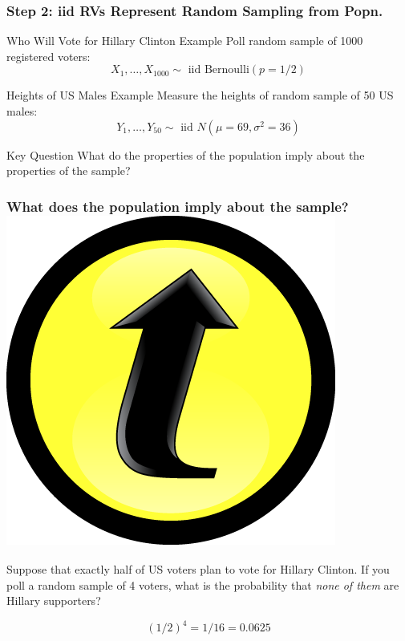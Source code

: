 \documentclass[handout]{beamer}
\begin{document}
\begin{frame}
  \frametitle{Step 2: iid RVs Represent Random Sampling from Popn.}
  \begin{block}{Who Will Vote for Hillary Clinton Example}
   Poll random sample of 1000 registered voters:
   $$X_1, \hdots, X_{1000} \sim \mbox{ iid Bernoulli}(p = 1/2)$$
  \end{block}
  \begin{block}{Heights of US Males Example}
   Measure the heights of random sample of 50 US males:
   $$Y_1, \hdots, Y_{50}  \sim \mbox{ iid } N(\mu = 69, \sigma^2 = 36)$$
  \end{block}

  \begin{block}{Key Question}
   What do the properties of the population imply about the properties of the sample? 
  \end{block}
\end{frame}
\begin{frame}
  \frametitle{What does the population imply about the sample? \hfill\includegraphics[scale = 0.05]{./images/clicker}}
Suppose that exactly half of US voters plan to vote for Hillary Clinton. 
If you poll a random sample of 4 voters, what is the probability that \emph{none of them} are Hillary supporters?

\pause

$$(1/2)^4 = 1/16 = 0.0625$$
\end{frame}
\end{document}
